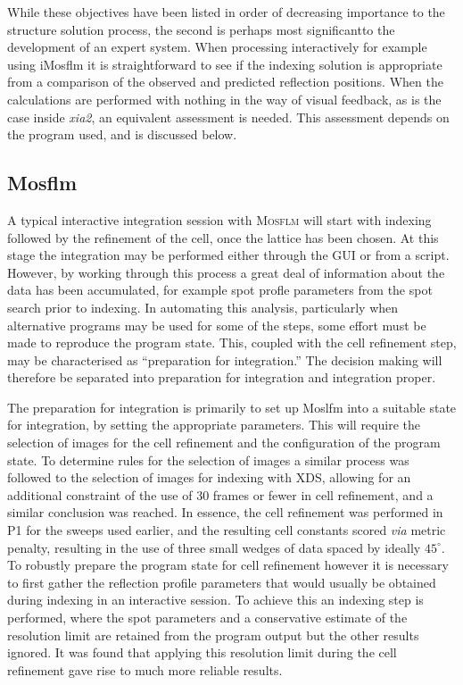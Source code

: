 \documentclass[preprint,pdf]{iucr}
\begin{document}
\noindent
While these objectives have been listed in order of decreasing
importance to the structure solution process, the second is perhaps
most significantto  the development of an expert system. When processing
interactively for example using iMosflm it is
straightforward to see if the indexing solution is appropriate from a
comparison of the observed and predicted reflection positions. When
the calculations are
performed with nothing in the way of visual feedback,
as is the case inside \emph{xia2}, an equivalent assessment is
needed. This assessment depends on the program used, and is
discussed below.

\subsection{Mosflm}

A typical interactive integration session with \textsc{Mosflm} will start with
indexing followed by the refinement of the cell, once the lattice has
been chosen. At this stage the integration may be performed either
through the GUI or from a script. However, by working through this
process a great deal of information about the data has been
accumulated, for example spot profle parameters from the spot search
prior to indexing. In automating this analysis, particularly when
alternative programs may be used for some of the steps, some effort
must be made to reproduce the program state. This, coupled with the
cell refinement step, may be characterised as ``preparation for
integration.'' The decision making will therefore be separated into
preparation for integration and integration proper.

The preparation for integration is primarily to set up Moslfm into
a suitable state for integration, by setting the appropriate
parameters. This will require the
selection of images for the cell refinement and
the configuration of the program state. To determine rules for the
selection of images a similar process was followed to the selection of
images for indexing with XDS, allowing for an additional constraint of
the use of 30 frames or fewer in cell refinement, and a similar
conclusion was reached. 
In essence, the cell refinement was performed in P1 for the
sweeps used earlier, and the resulting cell constants scored
\emph{via} metric penalty, resulting in the use of three small wedges
of data spaced by ideally $45^{\circ}$. To robustly prepare the program state
for cell refinement however it is necessary to first gather the
reflection profile parameters that would usually be obtained during
indexing in an interactive session. To achieve this an indexing step is
performed, where the spot parameters and a conservative
estimate of the resolution limit are retained from the program output
but the other results ignored. It was found that
applying this resolution limit during the cell refinement gave rise to
much more reliable results.
\end{document}
